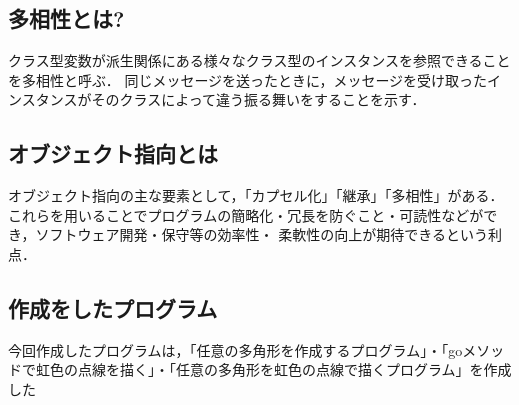 \documentclass{jarticle}
\begin{document}
\subsection{多相性とは?}
クラス型変数が派生関係にある様々なクラス型のインスタンスを参照できることを多相性と呼ぶ．
同じメッセージを送ったときに，メッセージを受け取ったインスタンスがそのクラスによって違う振る舞いをすることを示す．

\subsection{オブジェクト指向とは}
オブジェクト指向の主な要素として，「カプセル化」「継承」「多相性」がある．
これらを用いることでプログラムの簡略化・冗長を防ぐこと・可読性などができ，ソフトウェア開発・保守等の効率性・ 柔軟性の向上が期待できるという利点．

\subsection{作成をしたプログラム}
今回作成したプログラムは，「任意の多角形を作成するプログラム」・「goメソッドで虹色の点線を描く」・「任意の多角形を虹色の点線で描くプログラム」を作成した
\end{document}
